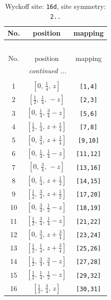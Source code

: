 \documentclass[fleqn,8pt]{jsarticle}
\begin{document}
\renewcommand{\arraystretch}{1.2}
\begin{longtable}{ccc}
\caption{Wyckoff site: {\tt 16d}, site symmetry: {\tt 2..}}
 \\
 \hline \hline
No. & position & mapping \\ \hline \endfirsthead

\multicolumn{2}{l}{\tablename\ \thetable{}} \\
 \hline \hline
No. & position & mapping \\ \hline \endhead

 \hline \hline
\multicolumn{2}{r}{\footnotesize\it continued ...} \\ \endfoot

 \hline \hline
\multicolumn{2}{r}{} \\ \endlastfoot

1 & $\left[ 0,\, \frac{1}{4},\, z \right]$ & {\tt [1,4]} \\ \hline
2 & $\left[ \frac{1}{2},\, \frac{1}{4},\, - z \right]$ & {\tt [2,3]} \\ \hline
3 & $\left[ 0,\, \frac{1}{4},\, \frac{3}{4} - z \right]$ & {\tt [5,6]} \\ \hline
4 & $\left[ \frac{1}{2},\, \frac{1}{4},\, z + \frac{1}{4} \right]$ & {\tt [7,8]} \\ \hline
5 & $\left[ 0,\, \frac{3}{4},\, z + \frac{1}{4} \right]$ & {\tt [9,10]} \\ \hline
6 & $\left[ 0,\, \frac{1}{4},\, \frac{1}{4} - z \right]$ & {\tt [11,12]} \\ \hline
7 & $\left[ 0,\, \frac{3}{4},\, - z \right]$ & {\tt [13,16]} \\ \hline
8 & $\left[ 0,\, \frac{1}{4},\, z + \frac{1}{2} \right]$ & {\tt [14,15]} \\ \hline
9 & $\left[ \frac{1}{2},\, \frac{3}{4},\, z + \frac{1}{2} \right]$ & {\tt [17,20]} \\ \hline
10 & $\left[ 0,\, \frac{3}{4},\, \frac{1}{2} - z \right]$ & {\tt [18,19]} \\ \hline
11 & $\left[ \frac{1}{2},\, \frac{3}{4},\, \frac{1}{4} - z \right]$ & {\tt [21,22]} \\ \hline
12 & $\left[ 0,\, \frac{3}{4},\, z + \frac{3}{4} \right]$ & {\tt [23,24]} \\ \hline
13 & $\left[ \frac{1}{2},\, \frac{1}{4},\, z + \frac{3}{4} \right]$ & {\tt [25,26]} \\ \hline
14 & $\left[ \frac{1}{2},\, \frac{3}{4},\, \frac{3}{4} - z \right]$ & {\tt [27,28]} \\ \hline
15 & $\left[ \frac{1}{2},\, \frac{1}{4},\, \frac{1}{2} - z \right]$ & {\tt [29,32]} \\ \hline
16 & $\left[ \frac{1}{2},\, \frac{3}{4},\, z \right]$ & {\tt [30,31]} \\
\end{longtable}
\end{document}
